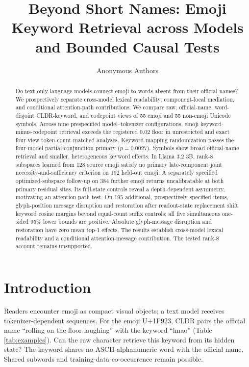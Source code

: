 \documentclass{article}
\title{Beyond Short Names: Emoji Keyword Retrieval across Models\\
and Bounded Causal Tests}
\author{Anonymous Authors}
\begin{document}
\maketitle

\begin{abstract}
Do text-only language models connect emoji to words absent from their official
names? We prospectively separate cross-model lexical readability,
component-local mediation, and conditional attention-path contributions.
We compare raw, official-name,
word-disjoint CLDR-keyword, and codepoint views of 55 emoji and 55 non-emoji
Unicode symbols. Across nine prespecified model--tokenizer configurations,
emoji keyword-minus-codepoint retrieval exceeds the registered 0.02 floor
in unrestricted and exact four-view token-count-matched analyses.
Keyword-mapping randomization passes the four-model
partial-conjunction primary ($p=0.0027$). Symbols show broad official-name retrieval and smaller,
heterogeneous keyword effects. In Llama 3.2 3B, rank-8 subspaces learned from
128 source emoji satisfy no primary late-component joint
necessity-and-sufficiency criterion on 192 held-out emoji. A separately
specified optimized-subspace follow-up on 384 further emoji returns
uncalibratable at both primary residual sites. Its full-state controls reveal
a depth-dependent asymmetry, motivating an attention-path test. On 195
additional, prospectively specified items, glyph-position message disruption
and restoration after readout-state replacement shift keyword cosine margins
beyond equal-count suffix controls; all five simultaneous one-sided 95\%
lower bounds are positive. Absolute glyph-message disruption and restoration
have zero mean top-1 effects. The results establish cross-model lexical
readability and a conditional attention-message contribution. The tested
rank-8 account remains unsupported.
\end{abstract}

\section{Introduction}

Readers encounter emoji as compact visual objects; a text model receives
tokenizer-dependent sequences. For the emoji U+1F923, CLDR pairs the official
name ``rolling on the floor laughing'' with the keyword ``lmao''
(Table \ref{tab:examples}). Can the raw character retrieve this keyword from
its hidden state? The keyword shares no ASCII-alphanumeric word with the
official name. Shared subwords and training-data co-occurrence remain possible.
\end{document}
